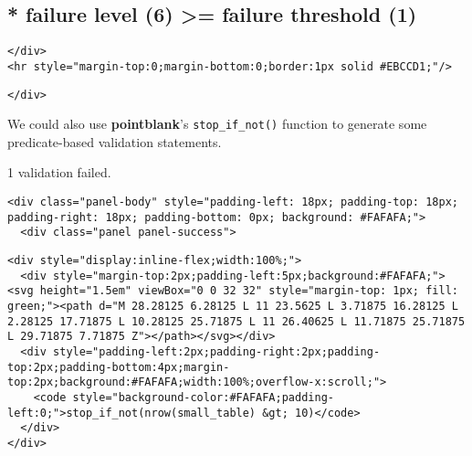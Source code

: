 \documentclass[
]{article}
\begin{document}
\hypertarget{failure-level-6-failure-threshold-1}{%
\subsection{* failure level (6) \textgreater= failure threshold
(1)}\label{failure-level-6-failure-threshold-1}}

\begin{verbatim}
</div>
<hr style="margin-top:0;margin-bottom:0;border:1px solid #EBCCD1;"/>
\end{verbatim}

\begin{verbatim}
</div>
\end{verbatim}

We could also use \textbf{pointblank}'s \texttt{stop\_if\_not()}
function to generate some predicate-based validation statements.

{1 validation failed.}

\hypertarget{chunk-3863885}{}
\begin{verbatim}
<div class="panel-body" style="padding-left: 18px; padding-top: 18px; padding-right: 18px; padding-bottom: 0px; background: #FAFAFA;">
  <div class="panel panel-success">
\end{verbatim}

\begin{verbatim}
<div style="display:inline-flex;width:100%;">
  <div style="margin-top:2px;padding-left:5px;background:#FAFAFA;"><svg height="1.5em" viewBox="0 0 32 32" style="margin-top: 1px; fill: green;"><path d="M 28.28125 6.28125 L 11 23.5625 L 3.71875 16.28125 L 2.28125 17.71875 L 10.28125 25.71875 L 11 26.40625 L 11.71875 25.71875 L 29.71875 7.71875 Z"></path></svg></div>
  <div style="padding-left:2px;padding-right:2px;padding-top:2px;padding-bottom:4px;margin-top:2px;background:#FAFAFA;width:100%;overflow-x:scroll;">
    <code style="background-color:#FAFAFA;padding-left:0;">stop_if_not(nrow(small_table) &gt; 10)</code>
  </div>
</div>
\end{verbatim}
\end{document}
